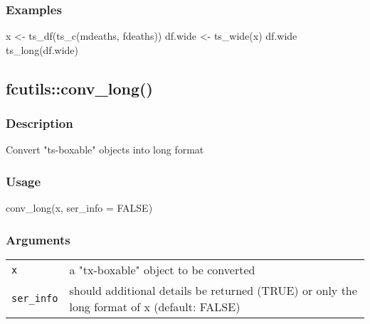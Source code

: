 \documentclass[
  letterpaper,
  DIV=11,
  numbers=noendperiod]{scrreport}
\newenvironment{Shaded}{\begin{snugshade}}{\end{snugshade}}
\newcommand{\AttributeTok}[1]{\textcolor[rgb]{0.40,0.45,0.13}{#1}}
\newcommand{\ConstantTok}[1]{\textcolor[rgb]{0.56,0.35,0.01}{#1}}
\newcommand{\FunctionTok}[1]{\textcolor[rgb]{0.28,0.35,0.67}{#1}}
\newcommand{\NormalTok}[1]{\textcolor[rgb]{0.00,0.23,0.31}{#1}}
\newcommand{\OtherTok}[1]{\textcolor[rgb]{0.00,0.23,0.31}{#1}}
\begin{document}
\subsubsection{Examples}\label{examples-51}

\begin{Shaded}
\begin{Highlighting}[]
\NormalTok{x }\OtherTok{\textless{}{-}} \FunctionTok{ts\_df}\NormalTok{(}\FunctionTok{ts\_c}\NormalTok{(mdeaths, fdeaths))}
\NormalTok{df.wide }\OtherTok{\textless{}{-}} \FunctionTok{ts\_wide}\NormalTok{(x)}
\NormalTok{df.wide}
\FunctionTok{ts\_long}\NormalTok{(df.wide)}
\end{Highlighting}
\end{Shaded}

\subsection{fcutils::conv\_long()}\label{fcutilsconv_long}

\subsubsection{Description}\label{description-52}

Convert "ts-boxable" objects into long format

\subsubsection{Usage}\label{usage-52}

\begin{Shaded}
\begin{Highlighting}[]
\FunctionTok{conv\_long}\NormalTok{(x, }\AttributeTok{ser\_info =} \ConstantTok{FALSE}\NormalTok{)}
\end{Highlighting}
\end{Shaded}

\subsubsection{Arguments}\label{arguments-52}

\begin{longtable}[]{@{}ll@{}}
\toprule\noalign{}
\endhead
\bottomrule\noalign{}
\endlastfoot
\texttt{x} & a "tx-boxable" object to be converted \\
\texttt{ser\_info} & should additional details be returned (TRUE) or
only the long format of x (default: FALSE) \\
\end{longtable}
\end{document}
